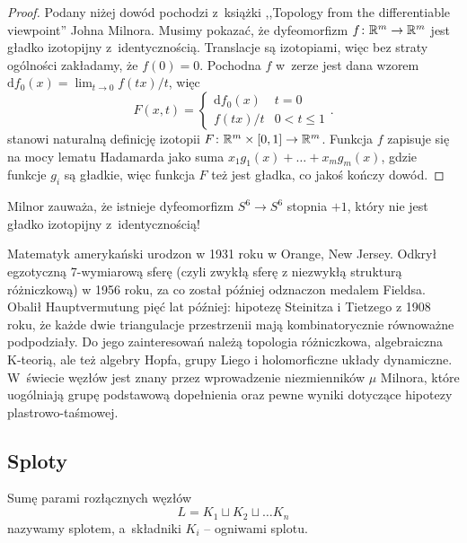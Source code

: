 \begin{proof}
    Podany niżej dowód pochodzi z~książki ,,Topology from the differentiable viewpoint'' Johna Milnora.
%
    Musimy pokazać, że dyfeomorfizm $f \colon \mathbb R^m \to \mathbb R^m$ jest gładko izotopijny z~identycznością.
    Translacje są izotopiami, więc bez straty ogólności zakładamy, że $f(0) = 0$.
    Pochodna $f$ w~zerze jest dana wzorem $\mathrm{d}f_0(x) = \lim_{t \to 0} f(tx) /t$, więc
    \begin{equation}
        F(x, t) = \begin{cases}
            \mathrm{d}f_0(x) & t = 0 \\
            f(tx) / t & 0 < t \le 1
        \end{cases} .
    \end{equation}
    stanowi naturalną definicję izotopii $F \colon \mathbb R^m \times [0, 1] \to \mathbb R^m$.
    Funkcja $f$ zapisuje się na mocy lematu Hadamarda jako suma $x_1 g_1(x) + \ldots + x_mg_m(x)$, gdzie funkcje $g_i$ są gładkie, więc funkcja $F$ też jest gładka, co jakoś kończy dowód.
%    
\end{proof}

Milnor zauważa, że istnieje dyfeomorfizm $S^6 \to S^6$ stopnia $+1$, który nie jest gładko izotopijny z~identycznością!
%

\begin{remark}
    Matematyk amerykański urodzon w 1931 roku w Orange, New Jersey.
    Odkrył egzotyczną 7-wymiarową sferę (czyli zwykłą sferę z niezwykłą strukturą różniczkową) w 1956 roku, za co został później odznaczon medalem Fieldsa.
    Obalił Hauptvermutung pięć lat później: hipotezę Steinitza i Tietzego z 1908 roku, że każde dwie triangulacje przestrzenii mają kombinatorycznie równoważne podpodziały.
    Do jego zainteresowań należą topologia różniczkowa, algebraiczna K-teorią, ale też algebry Hopfa, grupy Liego i holomorficzne układy dynamiczne.
    W~świecie węzłów jest znany przez wprowadzenie niezmienników $\mu$ Milnora, które uogólniają grupę podstawową dopełnienia oraz pewne wyniki dotyczące hipotezy plastrowo-taśmowej.
\end{remark}
%
%
%

\subsection{Sploty}
\begin{definition}
%
    Sumę parami rozłącznych węzłów
    \begin{equation}
        L = K_1 \sqcup K_2 \sqcup \ldots K_n
    \end{equation}
    nazywamy splotem, a~składniki $K_i$ -- ogniwami splotu.
\end{definition}

